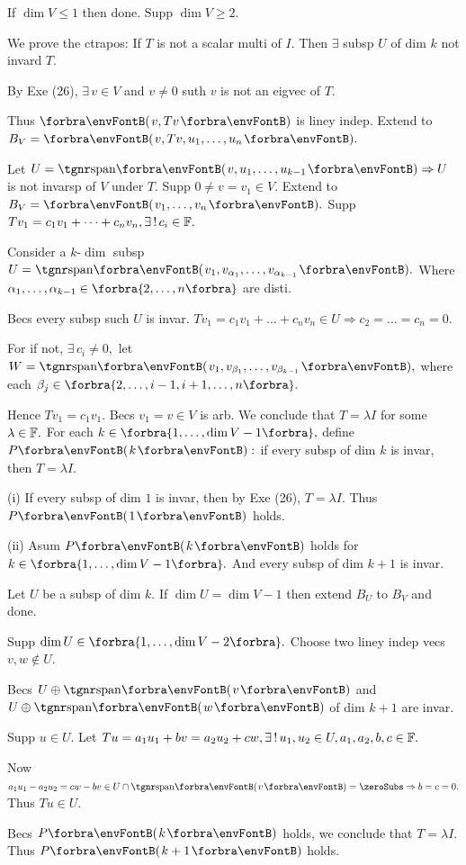 If $\dim V\leqslant 1$ then done. Supp $\dim V\geqslant 2.$\par\quad
We prove the ctrapos: {\tgsl If $T$ is not a scalar multi of $I$. Then $\exists$ subsp $U$ of dim $k$ not invard $T.$}\par\quad
By Exe (26), $\exists\,v\in V$ and $v\neq 0$ suth $v$ is not an eigvec of $T.$\par\quad
Thus $\Par{v,Tv}$ is liney indep. Extend to $B_V=\Par{v,Tv,u_1,\dots,u_n}.$\par\quad
Let $U=\Span{v,u_1,\dots,u_{k-1}}\Rightarrow U$ is not invarsp of $V$ under $T.$\PfEnd\vspace{6pt}\quad
\Or Supp $0\neq v=v_1\in V.$ Extend to $B_V=\Par{v_1,\dots,v_n}.$ Supp $Tv_1=c_1 v_1+\dots+c_n v_n,\exists\,!\,c_i\in{\mathbb{F}}.$\par\quad
Consider a $k$\hspace{1pt}-\hspace{1pt}$\dim$ subsp $U=\Span{v_1,v_{\alpha_1},\dots,v_{\alpha_{k-1}}}.$ Where $\alpha_1,\dots,\alpha_{k-1}\in\Bra{2,\dots,n}$ are disti.\par\quad
Becs every subsp such $U$ is invar. $Tv_1=c_1 v_1+\dots+c_n v_n\in U\Longrightarrow c_2=\dots=c_n=0.$\vspace{0pt}\par\quad
For if not, $\exists\,c_i\neq 0,$ let $W=\Span{v_1,v_{\beta_1},\dots,v_{\beta_{k-1}}},$ where each $\beta_j\in\Bra{{2,\dots,i-1,i+1,\dots,n}}.$\par\quad
Hence $Tv_1=c_1 v_1.$ Becs $v_1=v\in V$ is arb. We conclude that $T=\lambda I$ for some $\lambda\in{\mathbb{F}}.$\PfEnd\vspace{6pt}\quad
\Or For each $k\in\Bra{1,\dots,\dim V-1},$ define $P\Par{k}:$ if every subsp of dim $k$ is invar, then $T=\lambda I.$\par\quad
(i) If every subsp of dim $1$ is invar, then by Exe (26), $T=\lambda I.$ Thus $P\Par{1}$ holds.\par\quad\Endi
(ii) Asum $P\Par{k}$ holds for $k\in\Bra{1,\dots,\dim V-1}.$ And every subsp of dim $k+1$ is invar.\par\quad\Hii
Let $U$ be a subsp of dim $k.$ If $\dim U=\dim V-1$ then extend $B_U$ to $B_V$ and done.\par\quad\Hii
Supp $\dim U\in\Bra{1,\dots,\dim V-2}.$ Choose two liney indep vecs $v,w\not\in U.$\par\quad\Hii
Becs $U\oplus\Span{v}$ and $U\oplus\Span{w}$ of dim $k+1$ are invar.\par\quad\Hii
Supp $u\in U.$ Let $Tu=a_1u_1+bv=a_2u_2+cw,\exists\,!\,u_1,u_2\in U,a_1,a_2,b,c\in{\mathbb{F}}.$\par\quad\Hii
Now $a_1u_1-a_2u_2=cw-bv\in U\cap\Span{v}=\zeroSubs\Rightarrow b=c=0.$ Thus $Tu\in U.$\par\quad\Hii
Becs $P\Par{k}$ holds, we conclude that $T=\lambda I.$ Thus $P\Par{k+1}$ holds.\PfEnd
\SepLine

